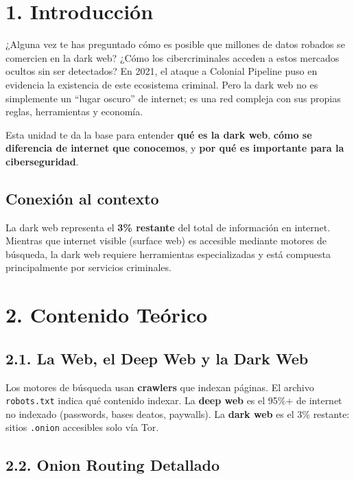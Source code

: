 \documentclass[
  letterpaper,
]{report}
\begin{document}
\section{1. Introducción}\label{introducciuxf3n}

¿Alguna vez te has preguntado cómo es posible que millones de datos
robados se comercien en la dark web? ¿Cómo los cibercriminales acceden a
estos mercados ocultos sin ser detectados? En 2021, el ataque a Colonial
Pipeline puso en evidencia la existencia de este ecosistema criminal.
Pero la dark web no es simplemente un ``lugar oscuro'' de internet; es
una red compleja con sus propias reglas, herramientas y economía.

Esta unidad te da la base para entender \textbf{qué es la dark web},
\textbf{cómo se diferencia de internet que conocemos}, y \textbf{por qué
es importante para la ciberseguridad}.

\subsection{Conexión al contexto}\label{conexiuxf3n-al-contexto}

La dark web representa el \textbf{3\% restante} del total de información
en internet. Mientras que internet visible (surface web) es accesible
mediante motores de búsqueda, la dark web requiere herramientas
especializadas y está compuesta principalmente por servicios criminales.

\section{2. Contenido Teórico}\label{contenido-teuxf3rico}

\subsection{2.1. La Web, el Deep Web y la Dark
Web}\label{la-web-el-deep-web-y-la-dark-web}

Los motores de búsqueda usan \textbf{crawlers} que indexan páginas. El
archivo \texttt{robots.txt} indica qué contenido indexar. La
\textbf{deep web} es el 95\%+ de internet no indexado (passwords, bases
deatos, paywalls). La \textbf{dark web} es el 3\% restante: sitios
\texttt{.onion} accesibles solo vía Tor.

\subsection{2.2. Onion Routing Detallado}\label{onion-routing-detallado}
\end{document}
